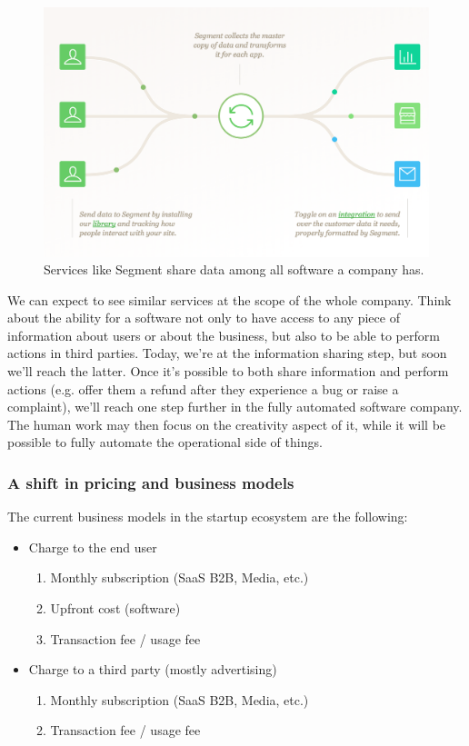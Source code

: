 \documentclass[12pt]{article}
\begin{document}
\begin{figure}[ht]
    \centering
    \includegraphics[scale=0.5]{segment}
    \caption{Services like Segment share data among all software a company has.}
    \label{fig:segment}
\end{figure}

\smallskip

We can expect to see similar services at the scope of the whole company. Think
about the ability for a software not only to have access to any piece of
information about users or about the business, but also to be able to perform
actions in third parties. Today, we're at the information sharing step, but soon
we'll reach the latter. Once it's possible to both share information and perform
actions (e.g. offer them a refund after they experience a bug or raise a
complaint), we'll reach one step further in the fully automated software
company. The human work may then focus on the creativity aspect of it, while it
will be possible to fully automate the operational side of things.

\subsubsection{A shift in pricing and business models}
The current business models in the startup ecosystem are the following:
\begin{itemize}
  \item Charge to the end user
  \begin{enumerate}
    \item Monthly subscription (SaaS B2B, Media, etc.)
    \item Upfront cost (software)
    \item Transaction fee / usage fee
  \end{enumerate}
  \item Charge to a third party (mostly advertising)
  \begin{enumerate}
    \item Monthly subscription (SaaS B2B, Media, etc.)
    \item Transaction fee / usage fee
  \end{enumerate}
\end{itemize}
\end{document}
